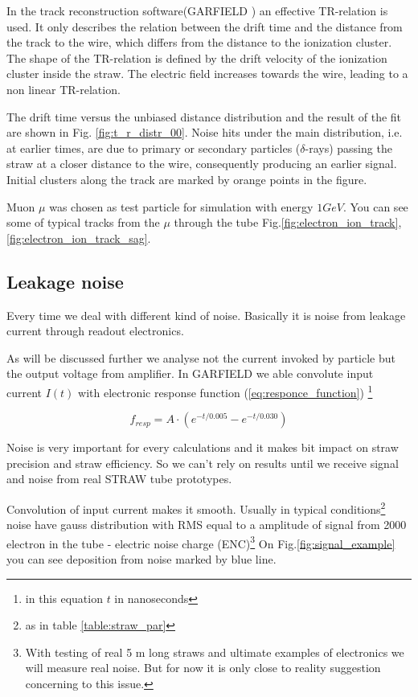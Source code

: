 	In the track reconstruction software(GARFIELD \cite{garfield}) an effective TR-relation is used. It only describes the relation between the drift time and the distance from the track to the wire, which differs from the distance to the ionization cluster. The shape of the TR-relation is defined by the drift velocity of the ionization cluster inside the straw. The electric field increases towards the wire, leading to a non linear TR-relation. 

	The drift time versus the unbiased distance distribution and the result of the fit are shown in Fig. \ref{fig:t_r_distr_00}. Noise hits under the main distribution, i.e. at earlier times, are due to primary or secondary particles ($\delta$-rays) passing the straw at a closer distance to the wire, consequently producing an earlier signal. Initial clusters along the track are marked by orange points in the figure.
	
	Muon $\mu$ was chosen as test particle for simulation with energy $1GeV$. You can see some of typical tracks from the $\mu$ through the tube Fig.\ref{fig:electron_ion_track},\ref{fig:electron_ion_track_sag}. 
			
	
	\subsection{ Leakage noise}
	Every time we deal with different kind of noise. Basically it is noise from  leakage current through readout electronics.

	As will be discussed further we analyse not the current invoked by particle but the output voltage from amplifier. In GARFIELD we able convolute input current $I(t)$ with electronic response function (\ref{eq:responce_function}) \footnote{in this equation $t$ in nanoseconds} 
	
	\begin{equation}
	f_{resp} =  A\cdot(e^{-t/0.005} - e^{-t/0.030})
	\label{eq:responce_function}
	\end{equation}
	
	Noise is very important for every calculations and it makes bit impact on straw precision and straw efficiency. So we can't rely on results until we receive signal and noise  from real STRAW tube prototypes. 
		
	Convolution of input current makes it smooth. Usually in typical conditions\footnote{as in table \ref{table:straw_par}} noise have gauss distribution with RMS equal to a amplitude of signal from 2000 electron in the tube - electric noise charge (ENC)\footnote{With testing of real 5 m long straws and ultimate examples of electronics we will measure real noise. But for now it is only close to reality suggestion concerning to this issue.} On Fig.\ref{fig:signal_example} you can see deposition from noise marked by blue line.

